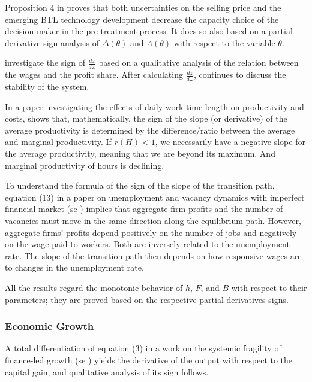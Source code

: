 \documentclass[11pt]{book}
\begin{document}
Proposition 4 in \cite{visschers2007employment} proves that both
uncertainties on the selling price and the emerging BTL technology
development decrease the capacity choice of the decision-maker in
the pre-treatment process. It does so also based on a partial derivative
sign analysis of $\Delta\left(\theta\right)$ and $\Lambda\left(\theta\right)$
with respect to the variable $\theta$.

\cite{schutz2009endogeneity} investigate
the sign of $\frac{dz}{d\omega}$ based on a qualitative analysis
of the relation between the wages and the profit share. After calculating $\frac{dz}{d\omega}$, continues to discuss the stability of the system.

In a paper investigating the effects of daily work time length on productivity and costs, \cite{delmez2018long} shows that, mathematically, the sign of the slope (or derivative) of the average
productivity is determined by the difference/ratio
between the average and marginal productivity. If $r\left(H\right)<1$,
we necessarily have a negative slope for the average productivity,
meaning that we are beyond its maximum. And marginal productivity
of hours is declining.

To understand the formula of the sign of the slope of the transition
path, equation (13) in a paper on unemployment and vacancy
dynamics with imperfect financial market (se \cite{carrillo2018unemployment}) implies that
aggregate firm profits and the number of vacancies must move in the
same direction along the equilibrium path. However, aggregate firms'
profits depend positively on the number of jobs and negatively on
the wage paid to workers. Both are inversely related to the unemployment
rate. The slope of the transition path then depends on how responsive
wages are to changes in the unemployment rate.

All the results \cite{di2019envelope} regard the monotonic behavior
of $h$, $F$, and $B$ with respect to their parameters; they are
proved based on the respective partial derivatives signs.


\subsubsection{Economic Growth}

A total differentiation of equation (3) in a work on the systemic fragility of
finance-led growth (se \cite{bhaduri2015systemic})
yields the derivative of the output with respect to the capital gain,
and qualitative analysis of its sign follows.
\end{document}
